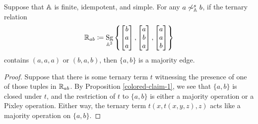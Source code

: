 \documentclass[letterpaper,11pt]{article}
\DeclareMathOperator{\Sg}{Sg}
\begin{document}
\begin{prop}\label{colored-claim-2} Suppose that $\mathbb{A}$ is finite, idempotent, and simple. For any $a \not\sim^s_{\mathbb{A}} b$, if the ternary relation
\[
\RR_{ab} \coloneqq \Sg_{\bA^3}\left\{\begin{bmatrix} b\\ a\\ a\end{bmatrix}, \begin{bmatrix} a\\ b\\ a\end{bmatrix}, \begin{bmatrix} a\\ a\\ b\end{bmatrix}\right\}
\]
contains $(a,a,a)$ or $(b,a,b)$, then $\{a,b\}$ is a majority edge.
\end{prop}
\begin{proof} Suppose that there is some ternary term $t$ witnessing the presence of one of those tuples in $\mathbb{R}_{ab}$. By Proposition \ref{colored-claim-1}, we see that $\{a,b\}$ is closed under $t$, and the restriction of $t$ to $\{a,b\}$ is either a majority operation or a Pixley operation. Either way, the ternary term $t(x,t(x,y,z),z)$ acts like a majority operation on $\{a,b\}$.
\end{proof}
\end{document}
